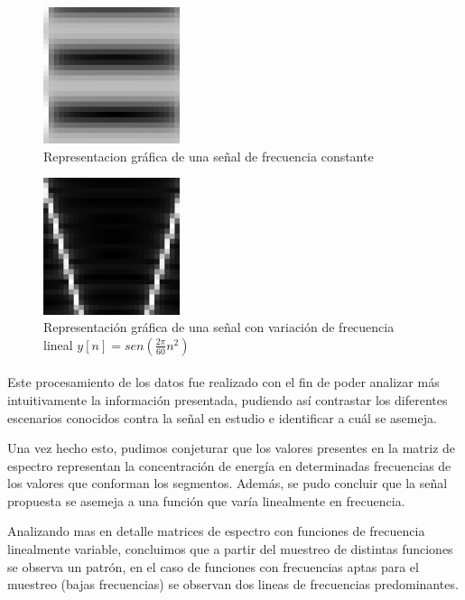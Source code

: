 \documentclass{article}
\begin{document}
        \begin{figure}[h!]
            \centering
            \includegraphics[width=40mm]{constante}
            \caption{Representacion gráfica de una señal de frecuencia constante}
            \label{imagen2}
        \end{figure}

        \begin{figure}[h!]
            \centering
            \includegraphics[width=40mm]{variable}
            \caption{Representación gráfica de una señal con variación de frecuencia lineal $y[n] = sen(\frac{2\pi}{60}n^2)$}
            \label{imagen3}
        \end{figure}

        \paragraph{}
        Este procesamiento de los datos fue realizado con el fin de poder analizar más intuitivamente la información presentada, 
        pudiendo así contrastar los diferentes escenarios conocidos contra la señal en estudio e identificar a cuál se asemeja.
        
        Una vez hecho esto, pudimos conjeturar que los valores presentes en la matriz de espectro representan la concentración de 
        energía en determinadas frecuencias de los valores que conforman los segmentos. Además, se pudo concluir que la señal propuesta 
        se asemeja a una función que varía linealmente en frecuencia.
        
        Analizando mas en detalle matrices de espectro con funciones de frecuencia linealmente variable, concluimos que a partir del muestreo de distintas funciones se observa un patrón, en el caso de funciones con frecuencias aptas para el muestreo (bajas frecuencias) se observan dos lineas de frecuencias predominantes. 
        
\end{document}
